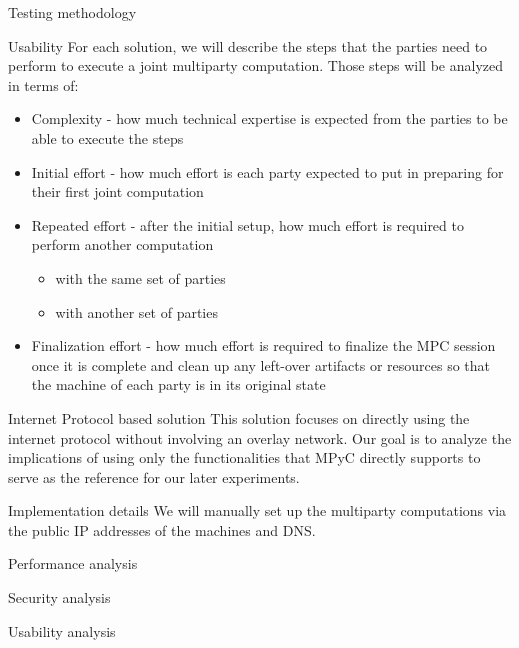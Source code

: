 \begin{frame}{Testing methodology}
\begin{block}{Usability}
\protect\hypertarget{thesis__030-methods.md__usability}{}
For each solution, we will describe the steps that the parties need to
perform to execute a joint multiparty computation. Those steps will be
analyzed in terms of:

\begin{itemize}
\tightlist
\item
  Complexity - how much technical expertise is expected from the parties
  to be able to execute the steps
\item
  Initial effort - how much effort is each party expected to put in
  preparing for their first joint computation
\item
  Repeated effort - after the initial setup, how much effort is required
  to perform another computation

  \begin{itemize}
  \tightlist
  \item
    with the same set of parties
  \item
    with another set of parties
  \end{itemize}
\item
  Finalization effort - how much effort is required to finalize the MPC
  session once it is complete and clean up any left-over artifacts or
  resources so that the machine of each party is in its original state
\end{itemize}
\end{block}
\end{frame}

\hypertarget{thesis__050-internet-protocol.md}{}
\begin{frame}{Internet Protocol based solution}
\protect\hypertarget{thesis__050-internet-protocol.md__internet-protocol-based-solution}{}
This solution focuses on directly using the internet protocol without
involving an overlay network. Our goal is to analyze the implications of
using only the functionalities that MPyC directly supports to serve as
the reference for our later experiments.

\begin{block}{Implementation details}
\protect\hypertarget{thesis__050-internet-protocol.md__implementation-details}{}
We will manually set up the multiparty computations via the public IP
addresses of the machines and DNS.
\end{block}

\begin{block}{Performance analysis}
\protect\hypertarget{thesis__050-internet-protocol.md__performance-analysis}{}
\end{block}

\begin{block}{Security analysis}
\protect\hypertarget{thesis__050-internet-protocol.md__security-analysis}{}
\end{block}

\begin{block}{Usability analysis}
\protect\hypertarget{thesis__050-internet-protocol.md__usability-analysis}{}
\end{block}
\end{frame}


